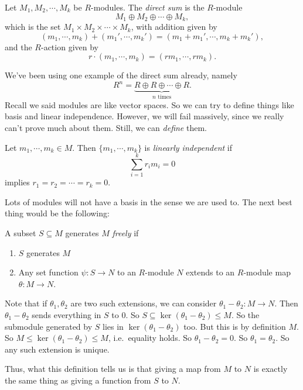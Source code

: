 \documentclass[a4paper]{article}
\begin{document}
\begin{defi}
  Let $M_1, M_2, \cdots, M_k$ be $R$-modules. The \emph{direct sum} is the $R$-module
  \[
    M_1 \oplus M_2 \oplus \cdots \oplus M_k,
  \]
  which is the set $M_1 \times M_2 \times \cdots \times M_k$, with addition given by
  \[
    (m_1, \cdots, m_k) + (m_1', \cdots, m_k') = (m_1 + m_1', \cdots, m_k + m_k'),
  \]
  and the $R$-action given by
  \[
    r\cdot (m_1, \cdots, m_k) = (rm_1, \cdots, rm_k).
  \]
\end{defi}
We've been using one example of the direct sum already, namely
\[
  R^n = \underbrace{R \oplus R \oplus \cdots \oplus R}_{n\text{ times}}.
\]
Recall we said modules are like vector spaces. So we can try to define things like basis and linear independence. However, we will fail massively, since we really can't prove much about them. Still, we can \emph{define} them.

\begin{defi}
  Let $m_1, \cdots, m_k \in M$. Then $\{m_1, \cdots, m_k\}$ is \emph{linearly independent} if
  \[
    \sum_{i = 1}^k r_i m_i = 0
  \]
  implies $r_1 = r_2 = \cdots = r_k = 0$.
\end{defi}

Lots of modules will not have a basis in the sense we are used to. The next best thing would be the following:
\begin{defi}
  A subset $S \subseteq M$ generates $M$ \emph{freely} if
  \begin{enumerate}
    \item $S$ generates $M$
    \item Any set function $\psi: S \to N$ to an $R$-module $N$ extends to an $R$-module map $\theta: M \to N$.
  \end{enumerate}
\end{defi}
Note that if $\theta_1, \theta_2$ are two such extensions, we can consider $\theta_1 - \theta_2: M \to N$. Then $\theta_1 - \theta_2$ sends everything in $S$ to $0$. So $S \subseteq \ker (\theta_1 - \theta_2) \leq M$. So the submodule generated by $S$ lies in $\ker (\theta_1 - \theta_2)$ too. But this is by definition $M$. So $M \leq \ker(\theta_1 - \theta_2) \leq M$, i.e.\ equality holds. So $\theta_1 - \theta_2 = 0$. So $\theta_1 = \theta_2$. So any such extension is unique.

Thus, what this definition tells us is that giving a map from $M$ to $N$ is exactly the same thing as giving a function from $S$ to $N$.
\end{document}
